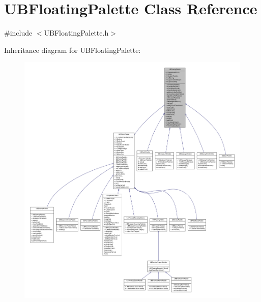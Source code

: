 \hypertarget{class_u_b_floating_palette}{\section{U\-B\-Floating\-Palette Class Reference}
\label{d1/d97/class_u_b_floating_palette}
}


{\ttfamily \#include $<$U\-B\-Floating\-Palette.\-h$>$}



Inheritance diagram for U\-B\-Floating\-Palette\-:
\nopagebreak
\begin{figure}[H]
\begin{center}
\leavevmode
\includegraphics[width=350pt]{d5/d0f/class_u_b_floating_palette__inherit__graph}
\end{center}
\end{figure}



